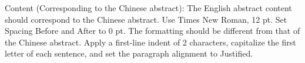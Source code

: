 

\begin{abstract}
  根据信阳师范大学学位论文撰写规范及论文示例（适用专业硕士），中文摘要主体内容一般在800-1000字之间，%
  小四号宋体字，限一页，段前后为“0”，首行缩进 2 字符书写
英文摘主体内容与中文摘要主体内容一致，具体要求可参考相关指导手册。%

\end{abstract}

\begin{abstract*}
  Content (Corresponding to the Chinese abstract): 
  The English abstract content should correspond to the Chinese abstract. 
  Use Times New Roman, 12 pt. Set Spacing Before and After to 0 pt.
   The formatting should be different from that of the Chinese abstract. 
  Apply a first-line indent of 2 characters, capitalize the first letter of each sentence, 
  and set the paragraph alignment to Justified.
\end{abstract*}
